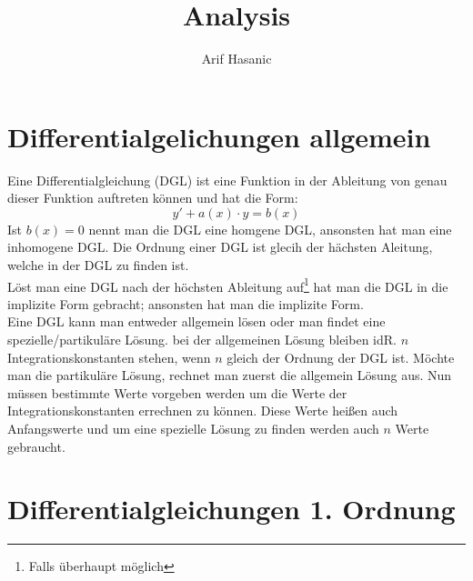 \documentclass[a4paper,10pt]{scrartcl}
\title{Analysis}
\author{Arif Hasanic}
\begin{document}
    \maketitle
    \afterpage{\null\newpage}
    \newpage
    \tableofcontents
    \newpage

    \section{Differentialgelichungen allgemein}
        Eine Differentialgleichung (DGL) ist eine Funktion in der Ableitung von genau dieser Funktion auftreten können und hat die Form: 
        \begin{equation}
            y' + a(x) \cdot y = b(x) 
        \end{equation}
        Ist \(b(x) = 0\) nennt man die DGL eine homgene DGL, ansonsten hat man eine inhomogene DGL. Die Ordnung einer DGL ist glecih der hächsten Aleitung,
        welche in der DGL zu finden ist. \\
        Löst man eine DGL nach der höchsten Ableitung auf\footnote{Falls überhaupt möglich} hat man die DGL in die implizite Form gebracht; ansonsten hat
        man die implizite Form. \\
        Eine DGL kann man entweder allgemein lösen oder man findet eine spezielle/partikuläre Lösung. bei der allgemeinen Lösung bleiben idR. \(n\) Integrationskonstanten
        stehen, wenn \(n\) gleich der Ordnung der DGL ist. Möchte man die partikuläre Lösung, rechnet man zuerst die allgemein Lösung aus. Nun müssen bestimmte Werte 
        vorgeben werden um die Werte der Integrationskonstanten errechnen zu können. Diese Werte heißen auch Anfangswerte und um eine spezielle Lösung zu finden werden
        auch \(n\) Werte gebraucht. 

    \section{Differentialgleichungen 1. Ordnung}
\end{document}
